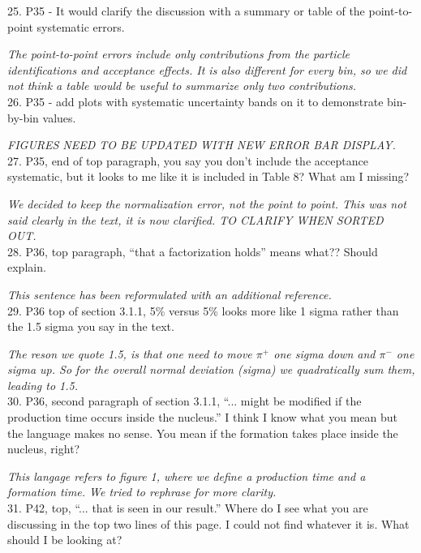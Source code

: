 \documentclass[12pt]{article}
\begin{document}
25.
P35 - It would clarify the discussion with a summary or table of the point-to-point systematic 
errors.

{\it The point-to-point errors include only contributions from the particle 
identifications and acceptance effects. It is also different for every bin, so
we did not think a table would be useful to summarize only two contributions.} \\

26.
P35 -
 add plots with systematic uncertainty bands on it to demonstrate bin-by-bin values.

{\it FIGURES NEED TO BE UPDATED WITH NEW ERROR BAR DISPLAY.} \\


27.
P35, end of top paragraph, you say you don’t include the acceptance systematic, but it looks 
to me like it is included in Table 8?  What am I missing?

{\it We decided to keep the normalization error, not the point to point. This was not
said clearly in the text, it is now clarified. TO CLARIFY WHEN SORTED OUT.} \\


28.
P36, top paragraph, “that a factorization holds” means what??  Should explain.  

{\it This sentence has been reformulated with an additional reference.} \\


29.
P36 top of section 3.1.1, 5\% versus 5\% looks more like 1 sigma rather than the 1.5 sigma 
you say in the text.

{\it The reson we quote 1.5, is that one need to move $\pi^+$ one sigma down and $\pi^-$ one
sigma up. So for the overall normal deviation (sigma) we quadratically sum them,
leading to 1.5.} \\

30.
P36, second paragraph of section 3.1.1, “... might be modified if the production time occurs 
inside the nucleus.”  I think I know what you mean but the language makes no sense.  You 
mean if the formation takes place inside the nucleus, right?

{\it This langage refers to figure 1, where we define a production time and a 
formation time. We tried to rephrase for more clarity.}\\

31.
P42, top, “... that is seen in our result.”  Where do I see what you are discussing in the top 
two lines of this page.  I could not find whatever it is.  What should I be looking at?
\end{document}

